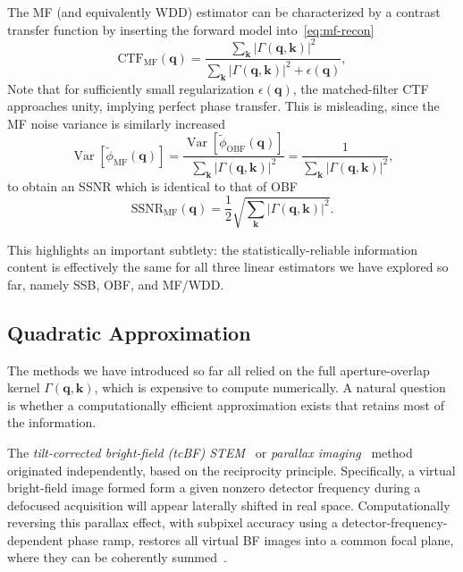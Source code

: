 \documentclass[pdflatex,sn-aps,iicol]{sn-jnl}%
\begin{document}
The MF (and equivalently WDD) estimator can be characterized by a contrast transfer function by inserting the forward model into~\cref{eq:mf-recon}
\begin{equation}
\mathrm{CTF}_{\text{MF}}(\boldsymbol{q})
=
\frac{\sum_{\boldsymbol{k}}\lvert \Gamma(\boldsymbol{q},\boldsymbol{k}) \rvert^2}
{\sum_{\boldsymbol{k}}\lvert \Gamma(\boldsymbol{q},\boldsymbol{k}) \rvert^2+\epsilon(\boldsymbol{q})},
\label{eq:mf-ctf}
\end{equation}
Note that for sufficiently small regularization $\epsilon(\boldsymbol{q})$, the matched-filter CTF approaches unity, implying perfect phase transfer.
This is misleading, since the MF noise variance is similarly increased
\begin{equation}
\operatorname{Var}\!\left[\tilde{\phi}_{\text{MF}}(\boldsymbol{q})\right]
=
\frac{\operatorname{Var}\!\left[\tilde{\phi}_{\text{OBF}}(\boldsymbol{q})\right]}{\sum_{\boldsymbol{k}}\lvert \Gamma(\boldsymbol{q},\boldsymbol{k}) \rvert^2}
=
\frac{1}{\sum_{\boldsymbol{k}}\lvert \Gamma(\boldsymbol{q},\boldsymbol{k}) \rvert^2},
\label{eq:mf-var}
\end{equation}
to obtain an SSNR which is identical to that of OBF
\begin{equation}
\mathrm{SSNR}_{\text{MF}}(\boldsymbol{q})
=
\frac{1}{2}
\sqrt{\sum_{\boldsymbol{k}}\lvert \Gamma(\boldsymbol{q},\boldsymbol{k}) \rvert^2}.
\label{eq:mf-ssnr}
\end{equation}

This highlights an important subtlety: the statistically-reliable information content is effectively the same for all three linear estimators we have explored so far, namely SSB, OBF, and MF/WDD.

\subsection{Quadratic Approximation} \label{sec:parallax}

The methods we have introduced so far all relied on the full aperture-overlap kernel $\Gamma(\boldsymbol{q},\boldsymbol{k})$, which is expensive to compute numerically.
A natural question is whether a computationally efficient approximation exists that retains most of the information.

The \emph{tilt-corrected bright-field (tcBF) STEM}~\cite{Nguyen_2016,Spoth_2017,Yu_2025} or \emph{parallax imaging}~\cite{Varnavides_2023,Varnavides_2024,Varnavides_2025} method originated independently, based on the reciprocity principle.
Specifically, a virtual bright-field image formed form a given nonzero detector frequency during a defocused acquisition will appear laterally shifted in real space.
Computationally reversing this parallax effect, with subpixel accuracy using a detector-frequency-dependent phase ramp, restores all virtual BF images into a common focal plane, where they can be coherently summed~\cite{Yu_2025,Varnavides_2025}.
\end{document}
